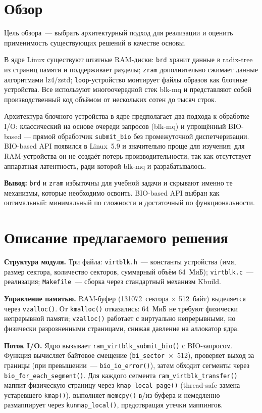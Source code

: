 \documentclass[a4paper]{article}
\begin{document}
\section{Обзор}

Цель обзора~--- выбрать архитектурный подход для реализации и оценить
применимость существующих решений в качестве основы.

В ядре Linux существуют штатные RAM-диски: \texttt{brd} хранит данные
в radix-tree из страниц памяти и поддерживает разделы; \texttt{zram} дополнительно
сжимает данные алгоритмами lz4/zstd; \texttt{loop}-устройство монтирует файлы
образов как блочные устройства. Все используют многоочередной стек blk-mq и
представляют собой производственный код объёмом от нескольких сотен до тысяч строк.

Архитектура блочного устройства в ядре предполагает два подхода к обработке I/O:
классический на основе очереди запросов (blk-mq) и упрощённый BIO-based --- прямой
обработчик \texttt{submit\_bio} без промежуточной диспетчеризации.
BIO-based API появился в Linux~5.9 и значительно проще для изучения; для
RAM-устройства он не создаёт потерь производительности, так как отсутствует
аппаратная латентность, ради которой blk-mq и разрабатывалось.

\textbf{Вывод:} \texttt{brd} и \texttt{zram} избыточны для учебной задачи и
скрывают именно те механизмы, которые необходимо освоить. BIO-based API выбран
как оптимальный: минимальный по сложности и достаточный по функциональности.

\section{Описание предлагаемого решения}

\textbf{Структура модуля.} Три файла: \texttt{virtblk.h}~--- константы устройства
(имя, размер сектора, количество секторов, суммарный объём 64~МиБ); \texttt{virtblk.c}~---
реализация; \texttt{Makefile}~--- сборка через стандартный механизм Kbuild.

\textbf{Управление памятью.} RAM-буфер (131072~сектора $\times$ 512~байт) выделяется
через \texttt{vzalloc()}. От \texttt{kmalloc()} отказались: 64~МиБ не требуют
физически непрерывной памяти; \texttt{vzalloc()} работает с виртуально
непрерывными, но физически разрозненными страницами, снижая давление на аллокатор ядра.

\textbf{Поток I/O.} Ядро вызывает \texttt{ram\_virtblk\_submit\_bio()}
с BIO-запросом. Функция вычисляет байтовое смещение (\texttt{bi\_sector}~$\times$~512),
проверяет выход за границы (при превышении~--- \texttt{bio\_io\_error()}), затем
обходит сегменты через \texttt{bio\_for\_each\_segment()}. Для каждого сегмента
\texttt{ram\_virtblk\_transfer()} маппит физическую страницу через
\texttt{kmap\_local\_page()} (thread-safe замена устаревшего \texttt{kmap()}),
выполняет \texttt{memcpy()} в/из буфера и немедленно размаппирует через
\texttt{kunmap\_local()}, предотвращая утечки маппингов.
\end{document}
